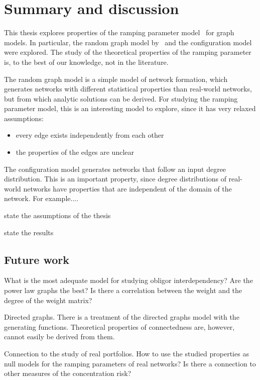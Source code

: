 \chapter{Summary and discussion} %
\label{cha:discussion}

This thesis explores properties of the ramping parameter model~\cite{Sindel:2009} for graph models.
In particular, the random graph model by~\cite{} and the configuration model were explored.
The study of the theoretical properties of the ramping parameter is, to the best of our knowledge, not in the literature.


The random graph model is a simple model of network formation, which generates networks with different statistical properties than real-world networks, but from which analytic solutions can be derived.
For studying the ramping parameter model, this is an interesting model to explore, since it has very relaxed assumptions:
\begin{itemize}
\item every edge exists independently from each other
\item the properties of the edges are unclear
\end{itemize}

The configuration model generates networks that follow an input degree distribution.
This is an important property, since degree distributions of real-world networks have properties that are independent of the domain of the network.
For example....



state the assumptions of the thesis

state the results


\section{Future work}
\label{sec:future_work}

What is the most adequate model for studying obligor interdependency?
Are the power law graphs the best?
Is there a correlation between the weight and the degree of the weight matrix?


Directed graphs.
There is a treatment of the directed graphs model with the generating functions.
Theoretical properties of connectedness are, however, cannot easily be derived from them.



Connection to the study of real portfolios.
How to use the studied properties as null models for the ramping parameters of real networks?
Is there a connection to other measures of the concentration risk?




